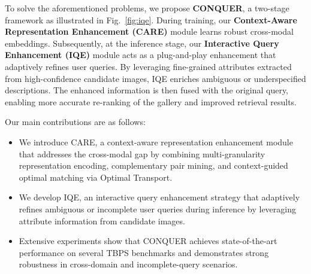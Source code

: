 To solve the aforementioned problems, we propose \textbf{CONQUER}, a two-stage framework as illustrated in Fig.~\ref{fig:iqe}. During training, our \textbf{Context-Aware Representation Enhancement (CARE)} module learns robust cross-modal embeddings. Subsequently, at the inference stage, our \textbf{Interactive Query Enhancement (IQE)} module acts as a plug-and-play enhancement that adaptively refines user queries. By leveraging fine-grained attributes extracted from high-confidence candidate images, IQE enriches ambiguous or underspecified descriptions. The enhanced information is then fused with the original query, enabling more accurate re-ranking of the gallery and improved retrieval results.

Our main contributions are as follows:
\begin{itemize}
    \item We introduce CARE, a context-aware representation enhancement module that addresses the cross-modal gap by combining multi-granularity representation encoding, complementary pair mining, and context-guided optimal matching via Optimal Transport.
    \item We develop IQE, an interactive query enhancement strategy that adaptively refines ambiguous or incomplete user queries during inference by leveraging attribute information from candidate images.
    
    \item Extensive experiments show that CONQUER achieves state-of-the-art performance on several TBPS benchmarks and demonstrates strong robustness in cross-domain and incomplete-query scenarios.
\end{itemize}